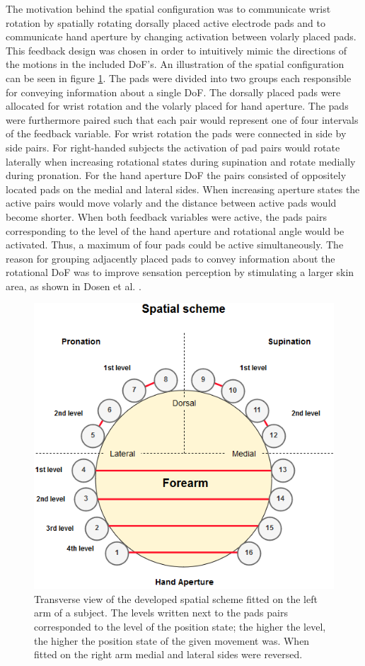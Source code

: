 The motivation behind the spatial configuration was to communicate wrist rotation by spatially rotating dorsally placed active electrode pads and to communicate hand aperture by changing activation between volarly placed pads. 
This feedback design was chosen in order to intuitively mimic the directions of the motions in the included DoF's. An illustration of the spatial configuration can be seen in figure \ref{fig:pa:spatial}. The pads were divided into two groups each responsible for conveying information about a single DoF. The dorsally placed pads were allocated for wrist rotation and the volarly placed for hand aperture. The pads were furthermore paired such that each pair would represent one of four intervals of the feedback variable. For wrist rotation the pads were connected in side by side pairs. For right-handed subjects the activation of pad pairs would rotate laterally when increasing rotational states during supination and rotate medially during pronation. For the hand aperture DoF the pairs consisted of oppositely located pads on the medial and lateral sides. When increasing aperture states the active pairs would move volarly and the distance between active pads would become shorter. When both feedback variables were active, the pads pairs corresponding to the level of the hand aperture and rotational angle would be activated. Thus, a maximum of four pads could be active simultaneously. The reason for grouping adjacently placed pads to convey information about the rotational DoF was to improve sensation perception by stimulating a larger skin area, as shown in Dosen et al. \cite{Dosen2015}. 
\begin{figure}[h]                 
	\includegraphics[width=.9\textwidth]{figures/El_array_spatial}  
	\caption{Transverse view of the developed spatial scheme fitted on the left arm of a subject. The levels written next to the pads pairs corresponded to the level of the position state; the higher the level, the higher the position state of the given movement was. When fitted on the right arm medial and lateral sides were reversed.}
	\label{fig:pa:spatial} 
\end{figure}   

